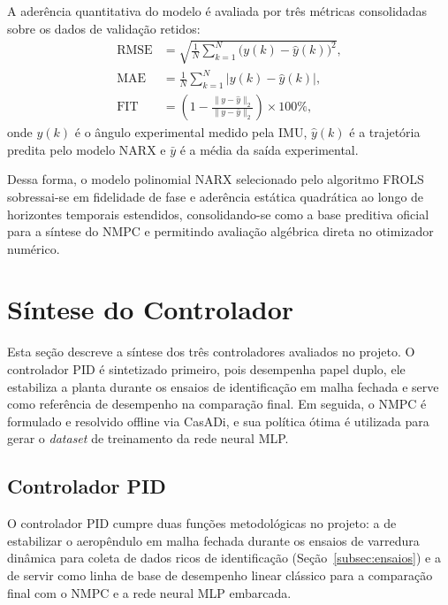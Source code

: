 A aderência quantitativa do modelo é avaliada por três métricas consolidadas sobre os dados de validação retidos:
\begin{align}
    \text{RMSE} &= \sqrt{\frac{1}{N} \sum_{k=1}^{N} \bigl(y(k) - \hat{y}(k)\bigr)^2}, \label{eq:rmse} \\
    \text{MAE}  &= \frac{1}{N} \sum_{k=1}^{N} \bigl|y(k) - \hat{y}(k)\bigr|, \label{eq:mae} \\
    \text{FIT}  &= \left(1 - \frac{\|y - \hat{y}\|_2}{\|y - \bar{y}\|_2}\right) \times 100\%, \label{eq:fit}
\end{align}
\noindent onde $y(k)$ é o ângulo experimental medido pela IMU, $\hat{y}(k)$ é a trajetória predita pelo modelo NARX e $\bar{y}$ é a média da saída experimental.

Dessa forma, o modelo polinomial NARX selecionado pelo algoritmo FROLS sobressai-se em fidelidade de fase e aderência estática quadrática ao longo de horizontes temporais estendidos, consolidando-se como a base preditiva oficial para a síntese do NMPC e permitindo avaliação algébrica direta no otimizador numérico.
 
 
\section{Síntese do Controlador}
\label{sec:sintese}
 
Esta seção descreve a síntese dos três controladores avaliados no projeto. O
controlador PID é sintetizado primeiro, pois desempenha papel duplo, ele estabiliza
a planta durante os ensaios de identificação em malha fechada e serve como
referência de desempenho na comparação final. Em seguida, o NMPC é formulado e
resolvido offline via CasADi, e sua política ótima é utilizada para gerar o
\textit{dataset} de treinamento da rede neural MLP.
 
\subsection{Controlador PID}
\label{sec:pid}

O controlador PID cumpre duas funções metodológicas no projeto: a de estabilizar o aeropêndulo em malha fechada durante os ensaios de varredura dinâmica para coleta de dados ricos de identificação (Seção~\ref{subsec:ensaios}) e a de servir como linha de base de desempenho linear clássico para a comparação final com o NMPC e a rede neural MLP embarcada.

